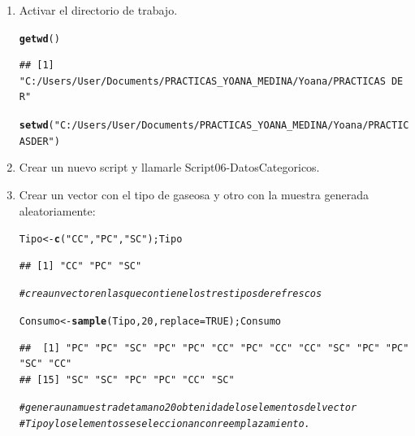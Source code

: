 \documentclass[12pt,letterpaper]{article}\usepackage[]{graphicx}\usepackage[]{color}
\makeatletter
\newcommand{\hlnum}[1]{\textcolor[rgb]{0.686,0.059,0.569}{#1}}%
\newcommand{\hlstr}[1]{\textcolor[rgb]{0.192,0.494,0.8}{#1}}%
\newcommand{\hlcom}[1]{\textcolor[rgb]{0.678,0.584,0.686}{\textit{#1}}}%
\newcommand{\hlstd}[1]{\textcolor[rgb]{0.345,0.345,0.345}{#1}}%
\newcommand{\hlkwb}[1]{\textcolor[rgb]{0.69,0.353,0.396}{#1}}%
\newcommand{\hlkwc}[1]{\textcolor[rgb]{0.333,0.667,0.333}{#1}}%
\newcommand{\hlkwd}[1]{\textcolor[rgb]{0.737,0.353,0.396}{\textbf{#1}}}%
\newenvironment{kframe}{%
 \def\at@end@of@kframe{}%
 \ifinner\ifhmode%
  \def\at@end@of@kframe{\end{minipage}}%
  \begin{minipage}{\columnwidth}%
 \fi\fi%
 \def\FrameCommand##1{\hskip\@totalleftmargin \hskip-\fboxsep
 \colorbox{shadecolor}{##1}\hskip-\fboxsep
     \hskip-\linewidth \hskip-\@totalleftmargin \hskip\columnwidth}%
 \MakeFramed {\advance\hsize-\width
   \@totalleftmargin\z@ \linewidth\hsize
   \@setminipage}}%
 {\par\unskip\endMakeFramed%
 \at@end@of@kframe}
\newenvironment{knitrout}{}{} %
\makeatother
\begin{document}
\begin{enumerate}
  \item  Activar el directorio de trabajo.

\begin{knitrout}
\color{fgcolor}\begin{kframe}
\begin{alltt}
\hlkwd{getwd}\hlstd{()}
\end{alltt}
\begin{verbatim}
## [1] "C:/Users/User/Documents/PRACTICAS_YOANA_MEDINA/Yoana/PRACTICAS DE R"
\end{verbatim}
\end{kframe}
\end{knitrout}
\begin{knitrout}
\color{fgcolor}\begin{kframe}
\begin{alltt}
\hlkwd{setwd}\hlstd{(}\hlstr{"C:/Users/User/Documents/PRACTICAS_YOANA_MEDINA/Yoana/PRACTICAS DE R"}\hlstd{)}
\end{alltt}
\end{kframe}
\end{knitrout}

\item  Crear un nuevo script y llamarle Script06-DatosCategoricos.

\item Crear un vector con el tipo de gaseosa y otro con la muestra generada aleatoriamente:
\begin{knitrout}
\color{fgcolor}\begin{kframe}
\begin{alltt}
\hlstd{Tipo} \hlkwb{<-} \hlkwd{c}\hlstd{(}\hlstr{"CC"}\hlstd{,} \hlstr{"PC"}\hlstd{,} \hlstr{"SC"}\hlstd{); Tipo}
\end{alltt}
\begin{verbatim}
## [1] "CC" "PC" "SC"
\end{verbatim}
\begin{alltt}
\hlcom{# crea un vector en las que contiene los tres tipos de refrescos}
\end{alltt}
\end{kframe}
\end{knitrout}
\begin{knitrout}
\color{fgcolor}\begin{kframe}
\begin{alltt}
\hlstd{Consumo} \hlkwb{<-} \hlkwd{sample}\hlstd{(Tipo,} \hlnum{20}\hlstd{,} \hlkwc{replace}\hlstd{=}\hlnum{TRUE}\hlstd{); Consumo}
\end{alltt}
\begin{verbatim}
##  [1] "PC" "PC" "SC" "PC" "PC" "CC" "PC" "CC" "CC" "SC" "PC" "PC" "SC" "CC"
## [15] "SC" "SC" "PC" "PC" "CC" "SC"
\end{verbatim}
\begin{alltt}
\hlcom{# genera una muestra de tamano 20 obtenida de los elementos del vector}
\hlcom{# Tipo y los elementos se seleccionan con reemplazamiento.}


\end{alltt}
\end{kframe}
\end{knitrout}
\end{enumerate}
\end{document}
